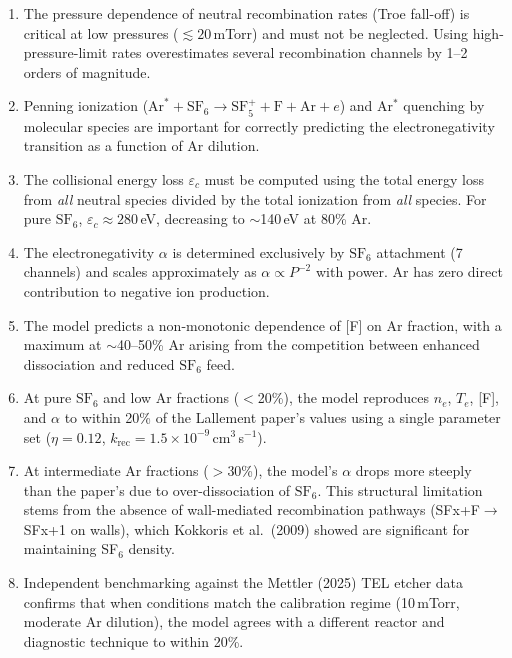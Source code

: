 \documentclass[11pt,a4paper]{article}
\newcommand{\SFsix}{\mathrm{SF}_6}
\newcommand{\SFfive}{\mathrm{SF}_5}
\newcommand{\Ar}{\mathrm{Ar}}
\newcommand{\Te}{T_e}
\newcommand{\nelec}{n_e}
\begin{document}
\begin{enumerate}
\item The pressure dependence of neutral recombination rates (Troe fall-off) is critical at low pressures ($\lesssim 20$\,mTorr) and must not be neglected.  Using high-pressure-limit rates overestimates several recombination channels by 1--2 orders of magnitude.

\item Penning ionization ($\Ar^* + \SFsix \to \SFfive^+ + \mathrm{F} + \Ar + e$) and Ar$^*$ quenching by molecular species are important for correctly predicting the electronegativity transition as a function of Ar dilution.

\item The collisional energy loss $\varepsilon_c$ must be computed using the total energy loss from \emph{all} neutral species divided by the total ionization from \emph{all} species.  For pure $\SFsix$, $\varepsilon_c \approx 280$\,eV, decreasing to $\sim$140\,eV at 80\% Ar.

\item The electronegativity $\alpha$ is determined exclusively by $\SFsix$ attachment (7 channels) and scales approximately as $\alpha \propto P^{-2}$ with power.  Ar has zero direct contribution to negative ion production.

\item The model predicts a non-monotonic dependence of [F] on Ar fraction, with a maximum at $\sim$40--50\% Ar arising from the competition between enhanced dissociation and reduced $\SFsix$ feed.

\item At pure $\SFsix$ and low Ar fractions ($<$20\%), the model reproduces $\nelec$, $\Te$, [F], and $\alpha$ to within 20\% of the Lallement paper's values using a single parameter set ($\eta = 0.12$, $k_\mathrm{rec} = 1.5 \times 10^{-9}$\,cm$^3$\,s$^{-1}$).

\item At intermediate Ar fractions ($>$30\%), the model's $\alpha$ drops more steeply than the paper's due to over-dissociation of $\SFsix$.  This structural limitation stems from the absence of wall-mediated recombination pathways (SFx+F$\to$SFx+1 on walls), which Kokkoris et al.\ (2009) showed are significant for maintaining SF$_6$ density.

\item Independent benchmarking against the Mettler (2025) TEL etcher data confirms that when conditions match the calibration regime (10\,mTorr, moderate Ar dilution), the model agrees with a different reactor and diagnostic technique to within 20\%.
\end{enumerate}
\end{document}
